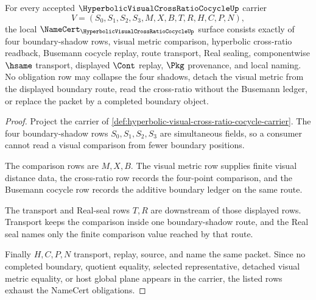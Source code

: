\begin{theorem}
\label{thm:hyperbolic-visual-cross-ratio-cocycle-namecert-obligations}
For every accepted $\HyperbolicVisualCrossRatioCocycleUp$ carrier
$$
V=(S_0,S_1,S_2,S_3,M,X,B,T,R,H,C,P,N),
$$
the local $\NameCert_{\HyperbolicVisualCrossRatioCocycleUp}$ surface consists exactly of four boundary-shadow rows, visual metric comparison, hyperbolic cross-ratio readback, Busemann cocycle replay, route transport, Real sealing, componentwise $\hsame$ transport, displayed $\Cont$ replay, $\Pkg$ provenance, and local naming. No obligation row may collapse the four shadows, detach the visual metric from the displayed boundary route, read the cross-ratio without the Busemann ledger, or replace the packet by a completed boundary object.
\end{theorem}
\begin{proof}
Project the carrier of \autoref{def:hyperbolic-visual-cross-ratio-cocycle-carrier}. The four boundary-shadow rows $S_0,S_1,S_2,S_3$ are simultaneous fields, so a consumer cannot read a visual comparison from fewer boundary positions.

The comparison rows are $M,X,B$. The visual metric row supplies finite visual distance data, the cross-ratio row records the four-point comparison, and the Busemann cocycle row records the additive boundary ledger on the same route.

The transport and Real-seal rows $T,R$ are downstream of those displayed rows. Transport keeps the comparison inside one boundary-shadow route, and the Real seal names only the finite comparison value reached by that route.

Finally $H,C,P,N$ transport, replay, source, and name the same packet. Since no completed boundary, quotient equality, selected representative, detached visual metric equality, or host global plane appears in the carrier, the listed rows exhaust the NameCert obligations.
\end{proof}

